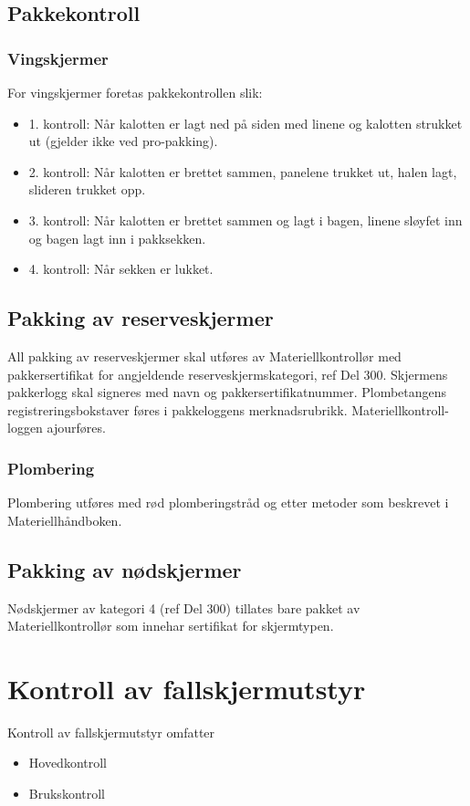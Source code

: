 \subsection{Pakkekontroll}
\subsubsection{Vingskjermer}
For vingskjermer foretas pakkekontrollen slik:
\begin{itemize}
	\item 1. kontroll: Når kalotten er lagt ned på siden med linene og kalotten strukket ut (gjelder ikke ved pro-pakking).
	\item 2. kontroll: Når kalotten er brettet sammen, panelene trukket ut, halen lagt, slideren trukket opp.
	\item 3. kontroll: Når kalotten er brettet sammen og lagt i bagen, linene sløyfet inn og bagen lagt inn i pakksekken.
	\item 4. kontroll: Når sekken er lukket.
\end{itemize}

\subsection{Pakking av reserveskjermer}
All pakking av reserveskjermer skal utføres av Materiellkontrollør med pakkersertifikat for angjeldende reserveskjermskategori, ref Del 300. Skjermens pakkerlogg skal signeres med navn og pakkersertifikatnummer. Plombetangens registreringsbokstaver føres i pakkeloggens merknadsrubrikk. Materiellkontroll-loggen ajourføres.

\subsubsection{Plombering}
Plombering utføres med rød plomberingstråd og etter metoder som beskrevet i Materiellhåndboken.

\subsection{Pakking av nødskjermer}
Nødskjermer av kategori 4 (ref Del 300) tillates bare pakket av Materiellkontrollør som innehar sertifikat for skjermtypen.

\section{Kontroll av fallskjermutstyr}
Kontroll av fallskjermutstyr omfatter
\begin{itemize}
	\item Hovedkontroll
	\item Brukskontroll
\end{itemize}

